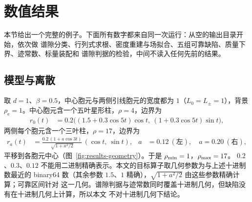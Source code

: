 \section{数值结果}
\label{sec:results}

本节给出一个完整的例子。下面所有数字都来自同一次运行：从空的输出目录开始，依次做
谱隙分类、行列式求根、密度重建与场拟合、五组可靠缺陷、质量下界、迹常数、标量装配和
谱隙判据的检验，中间不读入任何先前的结果。

\subsection{模型与离散}
\label{subsec:results-model}

取 $d=1$、$\beta=0.5$，中心胞元与两侧引线胞元的宽度都为 $1$（$L_0=L_\pm=1$），背景
$\rho_{\mathrm e}=1$。中心胞元含一个五叶星形柱，$\rho=4$，边界为
\begin{align*}
  r_0(t)&=0.2\bigl((1.5+0.3\cos5t)\cos t,\ (1+0.3\cos5t)\sin t\bigr),
\end{align*}
两侧每个胞元含一个三叶柱，$\rho=17$，边界为
\begin{align*}
  r_a(t)&=\frac{0.2\,(1+a\cos3t)}{\sqrt{1+a^2/2}}\,(\cos t,\ \sin t),
  &a&=0.12\ (\text{左}),\quad a=0.20\ (\text{右}),
\end{align*}
平移到各胞元中心（图~\ref{fig:results-geometry}）。于是 $\rho_{\min}=1$，$\rho_{\max}=17$。
$0.2$、$0.3$、$0.12$ 不能用二进制精确表示。本文的目标算子取几何参数为与上述十进制数最近的
binary64 数（其余参数 $1.5$、$1$ 精确），$\sqrt{1+a^2/2}$ 由这些参数精确计算；可靠区间针对
这一几何。谱隙判据与迹常数同时覆盖十进制几何，但缺陷没有在十进制几何上计算，所以本文
不对十进制几何下结论。

